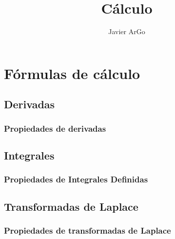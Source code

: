 \documentclass{article}
\title{Cálculo}
\author{Javier ArGo}
\begin{document}
\tableofcontents
\maketitle
%

\section{Fórmulas de cálculo}
\subsection{Derivadas}

\newpage
\subsubsection{Propiedades de derivadas}

\subsection{Integrales}

\subsubsection{Propiedades de Integrales Definidas}

\newpage
\subsection{Transformadas de Laplace}

\newpage
\subsubsection{Propiedades de transformadas de Laplace}

\end{document}

